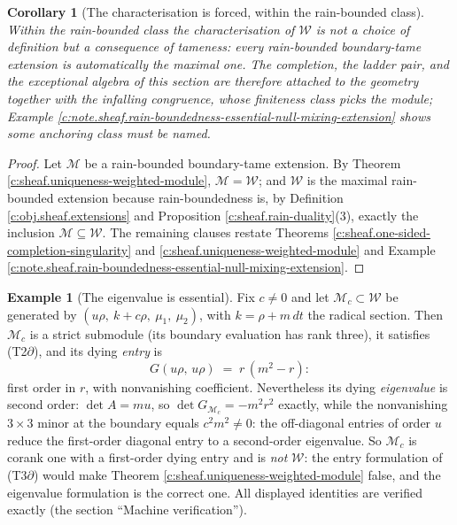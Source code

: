 \documentclass[11pt]{article}
\newtheorem{corollary}[theorem]{Corollary}
\theoremstyle{definition}
\newtheorem{example}[theorem]{Example}
\theoremstyle{plain}
\providecommand{\dtPG}{}\renewcommand{\dtPG}{dt}
\providecommand{\shW}{}\renewcommand{\shW}{\mathcal{W}}
\begin{document}
\begin{corollary}[The characterisation is forced, within the rain-bounded class]\label{c:sheaf.characterisation-forced-within-rain-bounded-class}
Within the rain-bounded class the characterisation of $\shW$ is not a choice of definition but a consequence of tameness: every rain-bounded boundary-tame extension is automatically the maximal one. The completion, the ladder pair, and the exceptional algebra of this section are therefore attached to the geometry together with the infalling congruence, whose finiteness class picks the module; Example \ref{c:note.sheaf.rain-boundedness-essential-null-mixing-extension} shows some anchoring class must be named.
\end{corollary}
\begin{proof}
Let $\mathcal{M}$ be a rain-bounded boundary-tame extension. By Theorem \ref{c:sheaf.uniqueness-weighted-module}, $\mathcal{M} = \shW$; and $\shW$ is the maximal rain-bounded extension because rain-boundedness is, by Definition \ref{c:obj.sheaf.extensions} and Proposition \ref{c:sheaf.rain-duality}(3), exactly the inclusion $\mathcal{M} \subseteq \shW$. The remaining clauses restate Theorems \ref{c:sheaf.one-sided-completion-singularity} and \ref{c:sheaf.uniqueness-weighted-module} and Example \ref{c:note.sheaf.rain-boundedness-essential-null-mixing-extension}.

\end{proof}

\begin{example}[The eigenvalue is essential]\label{c:note.sheaf.eigenvalue-essential}
Fix $c \neq 0$ and let $\mathcal{M}_c \subset \shW$ be generated by $(u\rho,\ k + c\rho,\ \mu_1,\ \mu_2)$, with $k = \rho + m\,\dtPG$ the radical section. Then $\mathcal{M}_c$ is a strict submodule (its boundary evaluation has rank three), it satisfies (T2$\partial$), and its dying \emph{entry} is
\[
G(u\rho,\,u\rho) \;=\; r\,(m^2 - r) :
\]
first order in $r$, with nonvanishing coefficient. Nevertheless its dying \emph{eigenvalue} is second order: $\det A = mu$, so $\det G_{\mathcal{M}_c} = -m^2 r^2$ exactly, while the nonvanishing $3\times 3$ minor at the boundary equals $c^2 m^2 \neq 0$: the off-diagonal entries of order $u$ reduce the first-order diagonal entry to a second-order eigenvalue. So $\mathcal{M}_c$ is corank one with a first-order dying entry and is \emph{not} $\shW$: the entry formulation of (T3$\partial$) would make Theorem \ref{c:sheaf.uniqueness-weighted-module} false, and the eigenvalue formulation is the correct one. All displayed identities are verified exactly (the section ``Machine verification'').
\end{example}
\end{document}
